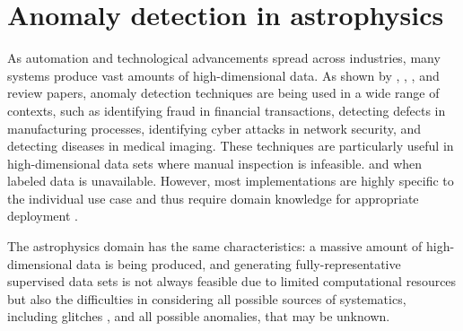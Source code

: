 \section{Anomaly detection in astrophysics}
\label{ss:ad-astrophysics}
As automation and technological advancements spread across industries, many systems produce vast amounts of high-dimensional data. As shown by \cite{chandola_2019}, \cite{blazquez2020review}, \cite{choi2021deep}, and \cite{Garg_2021} review papers, anomaly detection techniques are being used in a wide range of contexts, such as identifying fraud in financial transactions, detecting defects in manufacturing processes, identifying cyber attacks in network security, and detecting diseases in medical imaging. These techniques are particularly useful in high-dimensional data sets where manual inspection is infeasible. and when labeled data is unavailable. However, most implementations are highly specific to the individual use case and thus require domain knowledge for appropriate deployment \cite{choi2021deep}. 

The astrophysics domain has the same characteristics: a massive amount of high-dimensional data is being produced, and generating fully-representative supervised data sets is not always feasible due to limited computational resources but also the difficulties in considering all possible sources of systematics, including glitches \cite{Sadeh_2020}, and all possible anomalies, that may be unknown.

